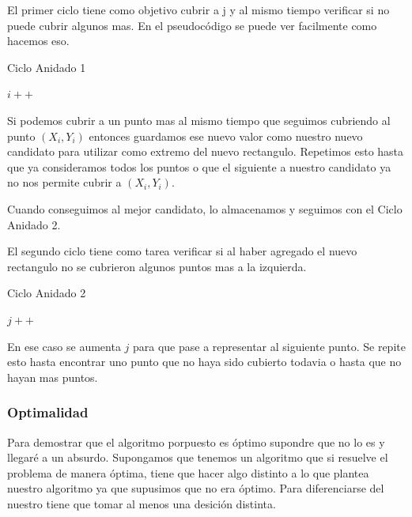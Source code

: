 El primer ciclo tiene como objetivo cubrir a j y al mismo tiempo verificar si no puede cubrir algunos mas. En el pseudocódigo se puede ver facilmente como hacemos eso.

\begin{algorithm}[H]
\begin{algorithmic}

\caption{Ciclo Anidado 1}

	\State $i++$
\EndWhile

\end{algorithmic}
\end{algorithm}

Si podemos cubrir a un punto mas al mismo tiempo que seguimos cubriendo al punto $(X_i,Y_i)$ entonces guardamos ese nuevo valor como nuestro nuevo candidato para utilizar como extremo del nuevo rectangulo. Repetimos esto hasta que ya consideramos todos los puntos o que el siguiente a nuestro candidato ya no nos permite cubrir a $(X_i,Y_i)$.

Cuando conseguimos al mejor candidato, lo almacenamos y seguimos con el Ciclo Anidado 2.

El segundo ciclo tiene como tarea verificar si al haber agregado el nuevo rectangulo no se cubrieron algunos puntos mas a la izquierda.

\begin{algorithm}[H]
\begin{algorithmic}

\caption{Ciclo Anidado 2}

	\State $j++$
\EndWhile

\end{algorithmic}
\end{algorithm}

En ese caso se aumenta $j$ para que pase a representar al siguiente punto. Se repite esto hasta encontrar uno punto que no haya sido cubierto todavia o hasta que no hayan mas puntos.

\subsubsection{Optimalidad}

Para demostrar que el algoritmo porpuesto es óptimo supondre que no lo es y llegaré a un absurdo. Supongamos que tenemos un algoritmo que si resuelve el problema de manera óptima, tiene que hacer algo distinto a lo que plantea nuestro algoritmo ya que supusimos que no era óptimo. Para diferenciarse del nuestro tiene que tomar al menos una desición distinta.

